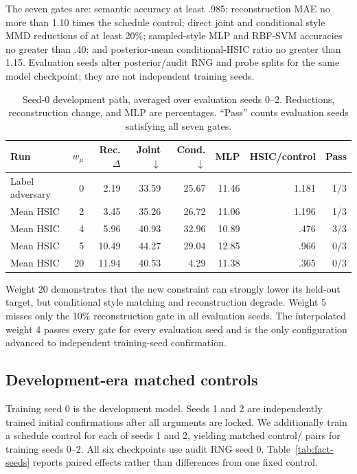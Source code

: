 The seven gates are: semantic accuracy at least .985; reconstruction MAE no
more than 1.10 times the schedule control; direct joint and conditional style
MMD reductions of at least 20\%; sampled-style MLP and RBF-SVM accuracies no
greater than .40; and posterior-mean conditional-HSIC ratio no greater than
1.15.  Evaluation seeds alter posterior/audit RNG and probe splits for the
same model checkpoint; they are not independent training seeds.

\begin{table}[ht]
\caption{Seed-0 development path, averaged over evaluation seeds 0--2.
Reductions, reconstruction change, and MLP are percentages.  ``Pass'' counts
evaluation seeds satisfying all seven gates.}
\label{tab:fact-development}
\centering
\scriptsize
\setlength{\tabcolsep}{3.5pt}
\begin{tabular}{lrrrrrrr}
\toprule
Run & $w_\mu$ & Rec. $\Delta$ & Joint $\downarrow$ & Cond. $\downarrow$ & MLP & HSIC/control & Pass \\
\midrule
Label adversary & 0 & 2.19 & 33.59 & 25.67 & 11.46 & 1.181 & 1/3 \\
Mean HSIC & 2 & 3.45 & 35.26 & 26.72 & 11.06 & 1.196 & 1/3 \\
Mean HSIC & 4 & 5.96 & 40.93 & 32.96 & 10.89 & .476 & 3/3 \\
Mean HSIC & 5 & 10.49 & 44.27 & 29.04 & 12.85 & .966 & 0/3 \\
Mean HSIC & 20 & 11.94 & 40.53 & 4.29 & 11.38 & .365 & 0/3 \\
\bottomrule
\end{tabular}
\end{table}

Weight 20 demonstrates that the new constraint can strongly lower its held-out
target, but conditional style matching and reconstruction degrade.  Weight 5
misses only the 10\% reconstruction gate in all evaluation seeds.  The
interpolated weight 4 passes every gate for every evaluation seed and is the
only configuration advanced to independent training-seed confirmation.

\subsection{Development-era matched controls}

Training seed 0 is the development model.  Seeds 1 and 2 are independently
trained initial confirmations after all arguments are locked.  We additionally
train a schedule control for each of seeds 1 and 2, yielding matched
control/\FACT{} pairs for training seeds 0--2.  All six checkpoints use audit
RNG seed 0.  Table~\ref{tab:fact-seeds} reports paired effects rather than
differences from one fixed control.


